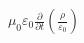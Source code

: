\documentclass[preview]{standalone}
\begin{document}
\begin{align*}
\mu_{0}\varepsilon_{0}  \frac{\partial}{\partial{t}}\left(\frac{\rho}{\varepsilon_{0}}\right)
\end{align*}
\end{document}
